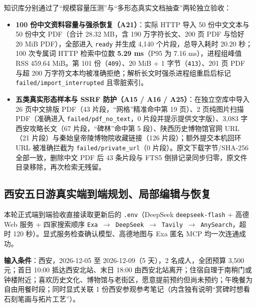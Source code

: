 知识库分别通过了“规模容量压测”与“多形态真实文档抽查”两轮独立验收：

\begin{itemize}
  \item \textbf{100 份中文资料容量与强杀恢复（A21）}：实际 HTTP 导入 50 份中文文本与 50 份中文 PDF（合计 28.32 MB，含 190 万字符长文、200 页 PDF 与恰好 20 MiB PDF），全部进入 \texttt{ready} 并生成 4,140 个片段，总导入耗时 20.20 秒；100 次专属词 HTTP 检索中位数 \textbf{5.29 ms}（P95 为 7.16 ms），进程组峰值 RSS 459.64 MiB。第 101 份（\texttt{409}）、20 MiB + 1 字节（\texttt{413}）、201 页 PDF 与超 200 万字符文本均被准确拒绝；解析长文时强杀进程组重启后标记 \texttt{failed/import\_interrupted} 且零脏索引。
  \item \textbf{五类真实形态样本与 SSRF 防护（A15 / A16 / A25）}：在独立空库中导入 26 页中文排版 PDF（43 片段，“网格”精准命中第 19 页）、2 页纯图片扫描 PDF（准确进入 \texttt{failed/pdf\_no\_text}，0 片段并提示提供文字版）、3,083 字西安攻略长文（67 片段，“碑林”命中第 5 段）、陕西历史博物馆官网 URL（21 片段）与秦始皇帝陵博物院收藏链接（126 片段）；额外提交本机回环 URL 被准确拦截为 \texttt{failed/private\_url}（0 片段）。原文下载字节/SHA-256 全部一致，删除中文 PDF 后 43 条片段与 FTS5 倒排记录同步归零，原文件目录移除，再次检索无残留。
\end{itemize}

\subsection{西安五日游真实端到端规划、局部编辑与恢复}

本轮正式端到端验收直接读取更新后的 \texttt{.env}（DeepSeek \texttt{deepseek-flash} + 高德 Web 服务 + 四家搜索顺序 \texttt{Exa $\rightarrow$ DeepSeek $\rightarrow$ Tavily $\rightarrow$ AnySearch}，超时 120 秒）。显式服务检查确认模型、高德地图与 Exa 匿名 MCP 均一次连通成功。

\textbf{输入条件}：西安，2026-12-05 至 2026-12-09（5 天），2 名成人，全团预算 3,500 元；首日 10:00 抵达西安北站、末日 18:00 由西安北站离开；住宿自理于南稍门或钟楼附近；喜欢历史文化、博物馆与老街区，愿意提前预约但尚未预约；午晚餐为自由用餐时段；同时显式关联 1 份西安参观参考笔记（内含独有说明“赏碑时想看石刻笔画与拓片工艺”）。

